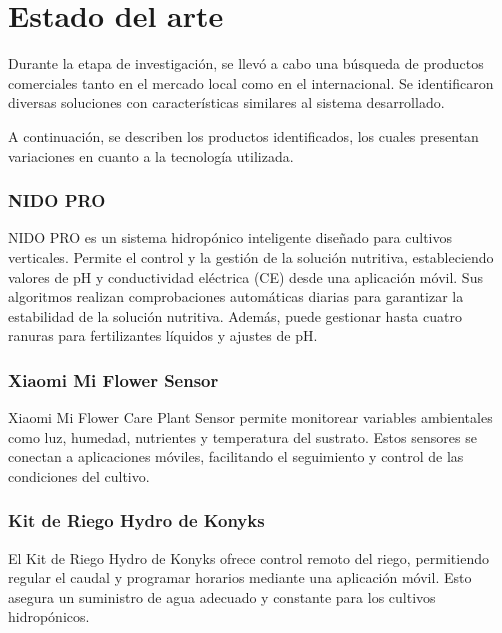 \section{Estado del arte}
Durante la etapa de investigación, se llevó a cabo una búsqueda de productos comerciales tanto en el mercado local como en el internacional. Se identificaron diversas soluciones con características similares al sistema desarrollado.

A continuación, se describen los productos identificados, los cuales presentan variaciones en cuanto a la tecnología utilizada.

\subsubsection{NIDO PRO}
NIDO PRO es un sistema hidropónico inteligente diseñado para cultivos verticales. Permite el control y la gestión de la solución nutritiva, estableciendo valores de pH y conductividad eléctrica (CE) desde una aplicación móvil. Sus algoritmos realizan comprobaciones automáticas diarias para garantizar la estabilidad de la solución nutritiva. Además, puede gestionar hasta cuatro ranuras para fertilizantes líquidos y ajustes de pH.

\subsubsection{Xiaomi Mi Flower Sensor}
Xiaomi Mi Flower Care Plant Sensor permite monitorear variables ambientales como luz, humedad, nutrientes y temperatura del sustrato. Estos sensores se conectan a aplicaciones móviles, facilitando el seguimiento y control de las condiciones del cultivo.

\subsubsection{Kit de Riego Hydro de Konyks}
El Kit de Riego Hydro de Konyks ofrece control remoto del riego, permitiendo regular el caudal y programar horarios mediante una aplicación móvil. Esto asegura un suministro de agua adecuado y constante para los cultivos hidropónicos.

